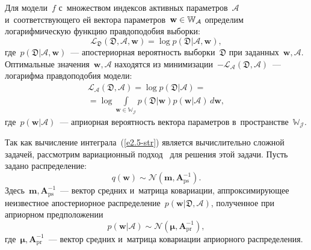 \begin{multicols}{2}
Для модели~$f$ с~множеством индексов активных па\-ра\-мет\-ров~$\mathcal{A}$ 
и~соответствующего ей вектора па\-ра\-мет\-ров~$\mathbf{w} \hm\in \mathbb{W_\mathcal{A}}$  
определим логарифмическую функцию правдоподобия выборки:
\begin{equation}
\mathcal{L}_\mathfrak{D}(\mathfrak{D}, \mathcal{A}, \mathbf{w}) = \log 
p(\mathfrak{D}|\mathcal{A}, \mathbf{w}), \label{e2.4-str}
\end{equation}
где~$p(\mathfrak{D}|\mathcal{A},\textbf{w})$~--- апостериорная вероятность 
выборки~$\mathfrak{D}$ при заданных~$\mathbf{w}, \mathcal{A}$.
Оптимальные значения~$\mathbf{w},\mathcal{A}$ находятся из 
минимизации~$-\mathcal{L}_{\mathcal{A}}(\mathfrak{D},\mathcal{A})$~--- логарифма правдоподобия 
модели:
\begin{multline}
\mathcal{L}_{\mathcal{A}}(\mathfrak{D},\mathcal{A}) =\log 
p(\mathfrak{D}|\mathcal{A}) = {}\\
{}=\log  \int\limits_{{\mathbf{w}\in\mathbb{W_\mathcal{J}}}}
p(\mathfrak{D} | \mathbf{w}) p(\mathbf{w} | \mathcal{A})\, d \mathbf{w}, 
\label{e2.5-str}
\end{multline}
где~$p(\mathbf{w}|\mathcal{A})$~---  априорная вероятность век\-то\-ра па\-ра\-мет\-ров 
в~пространстве~$\mathbb{W_\mathcal{J}}$.

Так как вычисление интеграла~(\ref{e2.5-str}) является вы\-чис\-ли\-тель\-но слож\-ной задачей, 
рас\-смот\-рим вариационный подход~\cite{bishop2006} для решения этой задачи. Пусть 
задано распределение:
\begin{equation*}
q(\mathbf{w})\sim \mathcal{N}\left(\mathbf{m}, \mathbf{A}^{-1}_{\mathrm{ps}}\right). 
\end{equation*}
Здесь~$\mathbf{m}, \mathbf{A}^{-1}_{\mathrm{ps}}$~--- вектор средних и~матрица 
ковариации, аппроксимирующее неизвестное апостериорное 
распределение~$p(\mathbf{w}|\mathfrak{D},\mathcal{A})$, полученное при априорном 
предположении
\begin{equation*}
p(\mathbf{w} | \mathcal{A})\sim \mathcal{N}
\left(\boldsymbol{\mu},\mathbf{A}^{-1}_{\mathrm{pr}}\right), 
\end{equation*}
где~$\boldsymbol{\mu},\mathbf{A}^{-1}_{\mathrm{pr}}$~--- вектор средних и~матрица 
ковариации априорного распределения.


\end{multicols}
